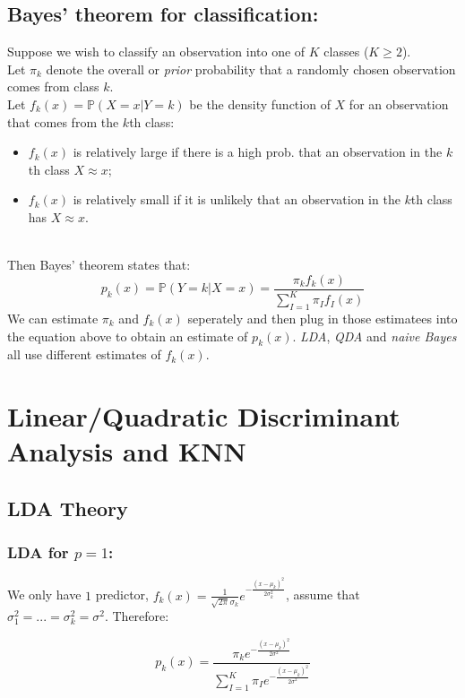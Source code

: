 \documentclass[11pt]{article}
\begin{document}
\subsection{Bayes' theorem for classification:}
\noindent Suppose we wish to classify an observation into one of $K$ classes ($K \geq 2$). \\

\noindent Let $\pi_{k}$ denote the overall or \textit{prior} probability that a randomly chosen observation comes from class $k$. \\

\noindent Let $f_k(x) = \mathbb{P}(X=x|Y=k)$ be the density function of $X$ for an observation that comes from the $k$th class:
\begin{itemize}
    \item $f_k(x)$ is relatively large if there is a high prob. that an observation in the $k$th class $X \approx x$;
    \item $f_k(x)$ is relatively small if it is unlikely that an observation in the $k$th class has $X \approx x$.
\end{itemize}
\phantom{i}
\\ \noindent Then Bayes' theorem states that:
$$p_k(x) = \mathbb{P}(Y=k|X=x) = \frac{\pi_k f_k(x)}{\sum_{I=1}^{K}{\pi_I f_I(x)}}$$
\noindent We can estimate $\pi_k$ and $f_k(x)$ seperately and then plug in those estimatees into the equation above to obtain an estimate of $p_k(x)$. \textit{LDA}, \textit{QDA} and \textit{naive Bayes} all use different estimates of $f_k(x)$.

\newpage    
\section{Linear/Quadratic Discriminant Analysis and KNN}
\subsection{LDA Theory}

\subsubsection{LDA for $p = 1$:}
\noindent We only have $1$ predictor, $f_k(x) = \frac{1}{\sqrt{2\pi}\sigma_{k}}e^{-\frac{(x-\mu_k)^2}{2\sigma_{k}^{2}}}$, assume that $\sigma_1^2 = ... = \sigma_k^2 = \sigma^2$. Therefore:

$$p_k(x) = \frac{\pi_k e^{-\frac{(x - \mu_k)^2}{2\sigma^2}}}{\sum_{I=1}^{K}{\pi_I  e^{-\frac{(x - \mu_k)^2}{2\sigma^2}}}}$$
\end{document}
